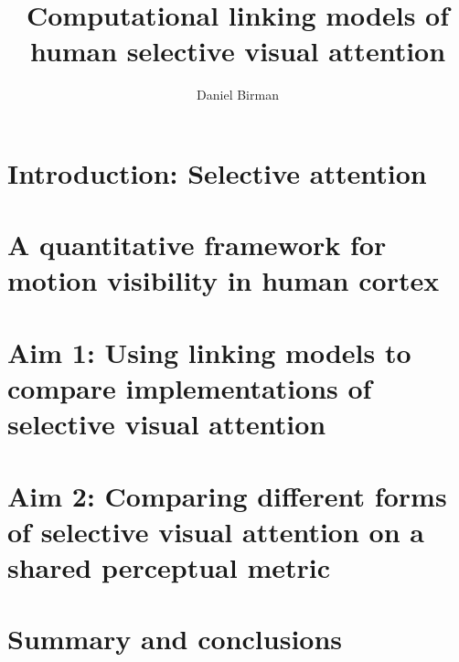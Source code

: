 \documentclass{report}
\begin{document}
\title{Computational linking models of\\human selective visual attention}
\author{Daniel Birman}

\beforepreface
{}

 


% 




\afterpreface

\chapter[Introduction]{Introduction: Selective attention}



\chapter[A framework for motion visibility]{A quantitative framework for motion visibility in human cortex}



\chapter[Fixed vs. flexible readout]{Aim 1: Using linking models to compare implementations of selective visual attention}



\chapter[Comparing spatial and feature-based attention]{Aim 2: Comparing different forms of selective visual attention on a shared perceptual metric}





\chapter[Conclusions]{Summary and conclusions}




\newpage
{}
\printbibliography
\end{document}
